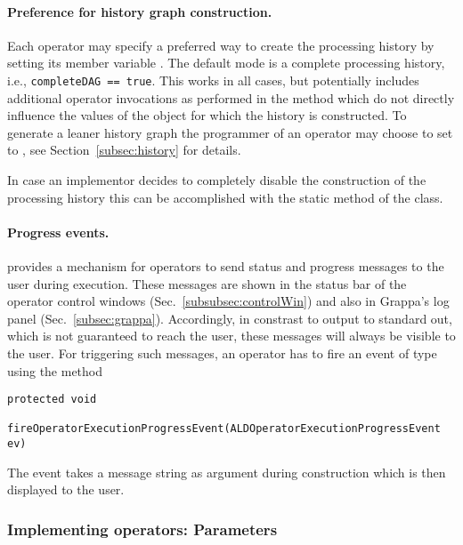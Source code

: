 \paragraph{Preference for history graph construction.}
Each operator may specify a preferred
way to create the processing history by setting
its member variable .
The default mode is a complete processing history,
i.e., \texttt{completeDAG == true}. This works in all cases,
but potentially includes additional operator invocations as performed in the
 method which do not directly influence
the values of the object for which the history is constructed.
To generate a leaner history graph the programmer of an operator
may choose to set  to , see
Section~\ref{subsec:history} for details.

In case an implementor decides to completely disable the construction of the processing history 
this can be accomplished with the static method  of
the  class.


\paragraph{Progress events.} \alida provides a mechanism for operators
to send status and progress messages to the user during execution. These messages
are shown in the status bar of the operator control windows
(Sec.~\ref{subsubsec:controlWin}) and also in Grappa's log panel
(Sec.~\ref{subsec:grappa}). Accordingly, in constrast to output to standard out,
which is not guaranteed to reach the user, these messages will always be visible
to the user. For triggering such messages, an operator has to fire an event of
type  using the method\\
\begin{lstlisting}[xrightmargin=.00\textwidth, xleftmargin=.0\textwidth,frame=single,numbers=none]
  protected void
	  fireOperatorExecutionProgressEvent(ALDOperatorExecutionProgressEvent ev)
\end{lstlisting}
The event takes a message string as argument during construction which is then
displayed to the user.

\subsubsection{Implementing operators: Parameters}
\label{subsubsec:datatypes}

